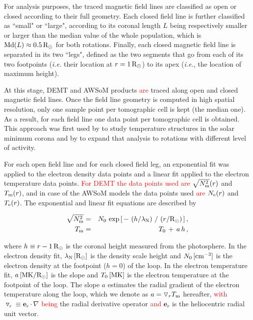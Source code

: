 \documentclass[namedreferences]{solarphysics}
\def\edit#1{\textcolor{Red}{#1}}
\renewcommand{\l}{\lambda_{\rm N}}%
\newcommand{\mrsun}{{\rm R_\odot}}
\newcommand{\MK}{{\rm MK}}
\newcommand{\cm}{{\rm cm}}
\newcommand{\cminvc}{\cm^{-3}}
\newcommand{\dr}{\triangledown_r}
\newcommand{\er}{\mathbf{e}_r}
\newcommand{\Te}{T_{\rm e}}
\newcommand{\Tm}{T_{\rm m}}
\newcommand{\Ne}{N_{\rm e}}
\newcommand{\Nsqm}{N^2_{{\rm m}}}
\newcommand{\sqravgN}{\sqrt{\Nsqm}}
\begin{document}
\begin{article}
{For analysis purposes, {the traced magnetic field lines are classified as open or closed according to their full geometry. Each closed field} line is further classified as ``small" or ``large", according to its coronal length $L$ being {respectively smaller or larger than the median value of the whole population, which is ${\rm Md}(L)\approx 0.5\,\mrsun$ for both rotations.} Finally, each closed magnetic field line is separated in its two ``legs", defined as the two segments that go from each of its two footpoints (\textit{i.e.} their location at $r=1\,\mrsun$) to its apex (\textit{i.e.}, the location of maximum height).}

At this {stage, DEMT and AWSoM products} \edit{are} traced along open and closed magnetic field lines. Once the field line geometry is computed in high spatial resolution, only one sample point per tomographic cell is kept (the median one). As a result, for each field line one data point per tomographic cell {is obtained. This approach} was first used by \citet{huang_2012} to {study temperature} structures in the solar minimum {corona and by} \citet{nuevo_2013} to expand that analysis to rotations with different level of activity.

For each open field line and {for each closed field leg}, an exponential fit {was applied} to the electron density {data points} and a linear fit applied to the electron temperature {data points}. \edit{For DEMT the data points used are} $\sqravgN(r)$ and $\Tm(r)$, and in case of {the AWSoM models} the data points used \edit{are} $\Ne(r)$ and $\Te(r)$. The exponential and linear fit equations are described by

\begin{eqnarray}\label{Nfit}
\sqravgN &=& N_0\,\exp{\left[\,-\,\left(h/\l\right)\,/\,\left(r/\mrsun\right)\,\right]} \,,\\
\label{Tfit}
\Tm &=& T_0\,+\,a\,h\,,
\end{eqnarray}

\noindent
where $h \equiv r - 1\,\mrsun$ is the coronal height measured from the photosphere. In the electron density fit, $\l\,[\mrsun]$ is the density scale height and $N_0\,[\cminvc]$ is the electron density at the footpoint ($h=0$) of the loop. In the electron temperature fit, $a\,[\MK/\mrsun]$ is the slope and $T_0\,[\MK]$ is the electron temperature at the footpoint of the loop. The slope $a$ estimates the radial gradient of the electron temperature along the loop, which we denote as $a = \dr\Tm$ hereafter, \edit{with} $\dr\equiv\er\cdot\nabla$ \edit{being} the radial derivative operator \edit{and} $\er$ is the heliocentric radial unit vector.


\end{article}
\end{document}
